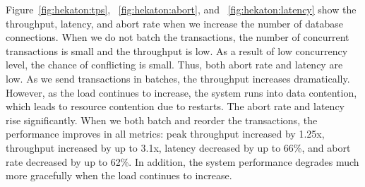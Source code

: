 Figure~\ref{fig:hekaton:tps}, ~\ref{fig:hekaton:abort}, and ~\ref{fig:hekaton:latency} show the throughput, latency, and abort rate when we increase the number of database connections. When we do not batch the transactions, the number of concurrent transactions is small and the throughput is low. As a result of low concurrency level, the chance of conflicting is small. Thus, both abort rate and latency are low. As we send transactions in batches, the throughput increases dramatically. However, as the load continues to increase, the system runs into data contention, which leads to resource contention due to restarts. The abort rate and latency rise significantly. When we both batch and reorder the transactions, the performance improves in all metrics: peak throughput increased by 1.25x, throughput increased by up to 3.1x, latency decreased by up to 66\%, and abort rate decreased by up to 62\%. In addition, the system performance degrades much more gracefully when the load continues to increase.
